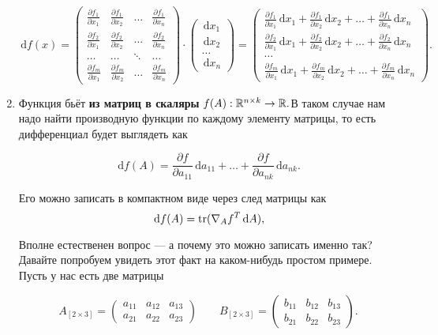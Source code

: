 \documentclass[12pt,fleqn]{article}
\newcommand{\dx}[1]{\,\mathrm{d}#1} %
\begin{document}
\begin{enumerate}
\[
\dx{f(x)} =  \begin{pmatrix} \frac{\partial f_1}{\partial x_1} & \frac{\partial f_1}{\partial x_2} & \ldots & \frac{\partial f_1}{\partial x_n} \\ \frac{\partial f_2}{\partial x_1}  & \frac{\partial f_2}{\partial x_2} & \ldots & \frac{\partial f_2}{\partial x_n}  \\ \ldots & \ldots & \ddots & \ldots  \\ \frac{\partial f_m}{\partial x_1}  & \frac{\partial f_m}{\partial x_2} & \ldots & \frac{\partial f_m}{\partial x_n} \end{pmatrix} \cdot  \begin{pmatrix} \dx{x_1} \\ \dx{x_2} \\ \ldots  \\ \dx{x_n} \end{pmatrix} =  \begin{pmatrix} \frac{\partial f_1}{\partial x_1} \dx{x_1} + \frac{\partial f_1}{\partial x_2} \dx{x_2} + \ldots + \frac{\partial f_1}{\partial x_n} \dx{x_n}  \\ \frac{\partial f_2}{\partial x_1} \dx{x_1} +  \frac{\partial f_2}{\partial x_2} \dx{x_2} + \ldots + \frac{\partial f_2}{\partial x_n} \dx{x_n}  \\ \ldots  \\ \frac{\partial f_m}{\partial x_1} \dx{x_1} + \frac{\partial f_m}{\partial x_2} \dx{x_2} + \ldots + \frac{\partial f_m}{\partial x_n} \dx{x_n} \end{pmatrix}.
\]

\item Функция бьёт \textbf{из матриц в скаляры} $f(A) : \RR^{n \times k} \to \RR.$В таком случае нам надо найти производную функции по каждому элементу матрицы, то есть дифференциал будет выглядеть как 

\[
\dx{f(A)} = \frac{\partial f}{\partial a_{11}} \dx{a_{11}} + \ldots + \frac{\partial f}{\partial a_{nk}} \dx{a_{nk}}.
\]

Его можно записать в компактном виде через след матрицы как 
\[
\dx{f(A)} = \Tr(\nabla_A f^T \dx{A}),
\] 

Вполне естественен вопрос --- а почему это можно записать именно так?  Давайте попробуем увидеть этот факт на каком-нибудь простом примере. Пусть у нас есть две матрицы 

\[
A_{[2 \times 3]} = \begin{pmatrix} a_{11} & a_{12} & a_{13} \\ a_{21} & a_{22} & a_{23} \end{pmatrix} \qquad B_{[2 \times 3]} = \begin{pmatrix} b_{11} & b_{12} & b_{13} \\ b_{21} & b_{22} & b_{23} \end{pmatrix}.
\]


\end{enumerate}
\end{document}
